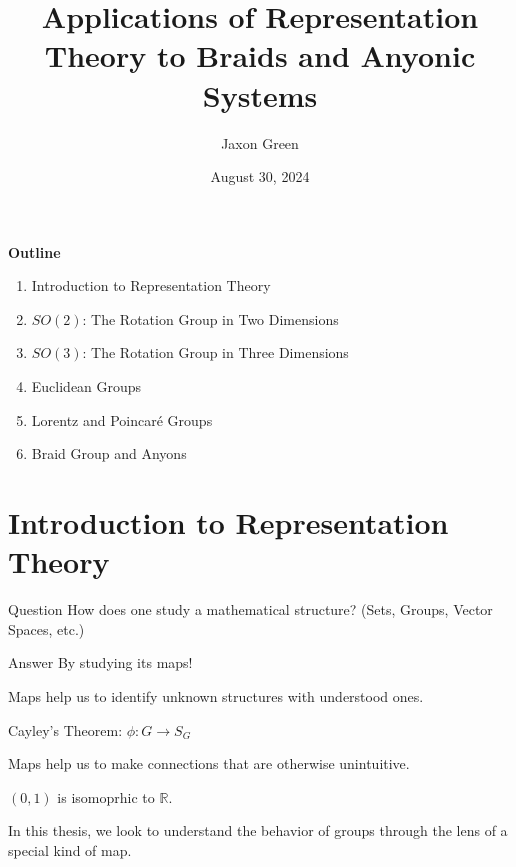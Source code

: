 \documentclass[compress,aspectratio=169,10pt,usenames,dvipsnames]{beamer}
\title[Thesis Defense]{Applications of Representation Theory to Braids and Anyonic Systems \\ \;}
\author[Jaxon Green]{Jaxon Green}
\institute[Cal Poly]{}%
\date{August 30, 2024}
\newcommand{\R}{\mathbb{R}}
\begin{document}
\begin{frame}
	\titlepage
\end{frame}

\begin{frame}
	\textbf{Outline}
	\begin{enumerate}
		\item Introduction to Representation Theory
		\item $SO(2)$: The Rotation Group in Two Dimensions
		\item $SO(3)$: The Rotation Group in Three Dimensions
		\item Euclidean Groups
		\item Lorentz and Poincar\'e Groups
		\item Braid Group and Anyons
	\end{enumerate}
\end{frame}


\section{Introduction to Representation Theory}
\begin{frame}
	\sectionpage
\end{frame}


\begin{frame}
	\vfill
	\begin{block}{Question}
		How does one study a mathematical structure? (Sets, Groups, Vector Spaces, etc.)
	\end{block}
	\vfill

	\begin{block}{Answer}
		By studying its maps!
	\end{block}
	
	\vfill
\end{frame}

\begin{frame}
	\vfill
	\begin{block}{}
		Maps help us to identify unknown structures with understood ones.
	\end{block}
	\vfill
	\begin{example}
		Cayley's Theorem: $\phi: G \rightarrow S_G$
	\end{example}
	\vfill
	\begin{block}{}
		Maps help us to make connections that are otherwise unintuitive.
	\end{block}
	\vfill
	\begin{example}
		$(0,1)$ is isomoprhic to $\R$.
	\end{example}
	\vfill
%
%
	\begin{block}{}
		In this thesis, we look to understand the behavior of groups through the lens of a special kind of map.
	\end{block}
	\vfill
\end{frame}
\end{document}
